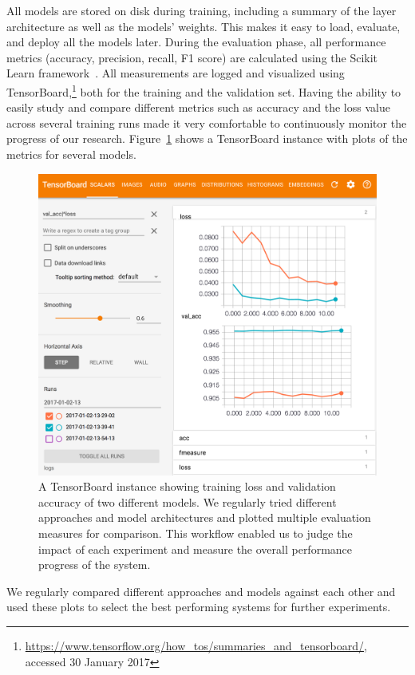 	All models are stored on disk during training, including a summary of the layer architecture as well as the models' weights. This makes it easy to load, evaluate, and deploy all the models later. During the evaluation phase, all performance metrics (accuracy, precision, recall, F1 score) are calculated using the Scikit Learn framework~\cite{scikit-learn}. All measurements are logged and visualized using TensorBoard,\footnote{\url{https://www.tensorflow.org/how_tos/summaries_and_tensorboard/}, accessed 30 January 2017} both for the training and the validation set. Having the ability to easily study and compare different metrics such as accuracy and the loss value across several training runs made it very comfortable to continuously monitor the progress of our research. Figure~\ref{fig:tensorboard} shows a TensorBoard instance with plots of the metrics for several models.
%
	\begin{figure}[tp]
  		\centering
    	\includegraphics[width=\textwidth,keepaspectratio]{img/tensorboard2.png}
    	\caption{A TensorBoard instance showing training loss and validation accuracy of two different models. We regularly tried different approaches and model architectures and plotted multiple evaluation measures for comparison. This workflow enabled us to judge the impact of each experiment and measure the overall performance progress of the system.}
    	\label{fig:tensorboard}
	\end{figure}
%
We regularly compared different approaches and models against each other and used these plots to select the best performing systems for further experiments.

